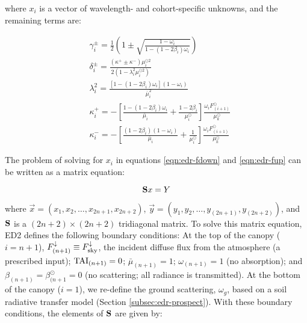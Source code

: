 where $x_{i}$ is a vector of wavelength- and cohort-specific unknowns, and the remaining terms are:

\begin{align}
  & \gamma^{\pm}_{i} = \frac{1}{2} \left( 1 \pm \sqrt{ \frac{1-\omega_{i}}{1-(1-2\beta_{i})\omega_{i}} } \right) \\
  & \delta^{\pm}_{i} = \frac{\left( \kappa^{+} \pm \kappa^{-} \right) \mu^{\odot 2}_{i}}{2\left( 1 - \lambda_{i}^{2} \mu^{\odot 2}_{i}\right)} \\
  & \lambda^{2}_{i} = \frac{\left[ 1-(1-2\beta_{i})\omega_{i} \right]\left(1-\omega_{i}\right)}{\bar{\mu}_{i}^{2}} \\
  & \kappa^{+}_{i} = -\left[\frac{1 - \left(1 - 2\beta_{i}\right)\omega_{i}}{\bar{\mu}_{i}} + \frac{1 - 2\beta_{i}}{\mu^{\odot}_{i}}\right] \frac{\omega_{i}F^{\odot}_{(i+1)}}{\mu^{\odot}_{k}} \\
  & \kappa^{-}_{i} = -\left[\frac{\left(1 - 2\beta_{i}\right)\left(1-\omega_{i}\right)}{\bar{\mu}_{i}} + \frac{1}{\mu^{\odot}_{i}}\right] \frac{\omega_{i}F^{\odot}_{(i+1)}}{\mu^{\odot}_{k}}
\end{align}

The problem of solving for $x_{i}$ in equations \ref{eqn:edr-fdown} and \ref{eqn:edr-fup} can be written as a matrix equation:

\begin{equation}
  \mathbf{S} \relax{x} = \relax{Y}
\end{equation}

where $\vec{x} = \left( x_{1},x_{2}, \ldots, x_{2n+1}, x_{2n+2} \right)$,
$\vec{y} = \left( y_{1}, y_{2}, \ldots, y_{(2n+1)}, y_{(2n+2)} \right)$,
and $\mathbf{S}$ is a $(2n + 2) \times (2n + 2)$ tridiagonal matrix.
To solve this matrix equation, ED2 defines the following boundary conditions:
At the top of the canopy ($i=n+1$),
$F^{\downarrow}_{(n+1)} \equiv F^{\downarrow}_{\mathrm{sky}}$, the incident diffuse flux from the atmosphere (a prescribed input);
$\mathrm{TAI}_{(n+1)} = 0$;
$\bar{\mu}_{(n+1)} = 1$;
$\omega_{(n+1)} = 1$ (no absorption);
and
$\beta_{(n+1)} = \beta^{\odot}_{(n+1} = 0$ (no scattering; all radiance is transmitted).
At the bottom of the canopy ($i=1$), we re-define the ground scattering, $\omega_{g}$, based on a soil radiative transfer model (Section \ref{subsec:edr-prospect}).
With these boundary conditions, the elements of $\mathbf{S}$ are given by:

